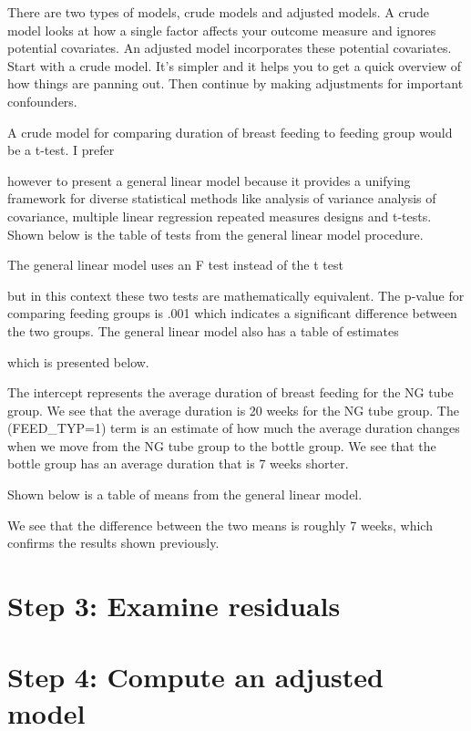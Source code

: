 \documentclass[
  letterpaper,
  DIV=11,
  numbers=noendperiod]{scrreprt}
\begin{document}
\begin{tcolorbox}
There are two types of models, crude models and adjusted models. A crude
model looks at how a single factor affects your outcome measure and
ignores potential covariates. An adjusted model incorporates these
potential covariates. Start with a crude model. It's simpler and it
helps you to get a quick overview of how things are panning out. Then
continue by making adjustments for important confounders.

A crude model for comparing duration of breast feeding to feeding group
would be a t-test. I prefer

however to present a general linear model because it provides a unifying
framework for diverse statistical methods like analysis of variance
analysis of covariance, multiple linear regression repeated measures
designs and t-tests. Shown below is the table of tests from the general
linear model procedure.

The general linear model uses an F test instead of the t test

but in this context these two tests are mathematically equivalent. The
p-value for comparing feeding groups is .001 which indicates a
significant difference between the two groups. The general linear model
also has a table of estimates

which is presented below.

The intercept represents the average duration of breast feeding for the
NG tube group. We see that the average duration is 20 weeks for the NG
tube group. The (FEED\_TYP=1) term is an estimate of how much the
average duration changes when we move from the NG tube group to the
bottle group. We see that the bottle group has an average duration that
is 7 weeks shorter.

Shown below is a table of means from the general linear model.

We see that the difference between the two means is roughly 7 weeks,
which confirms the results shown previously.

\section{Step 3: Examine residuals}\label{step-3-examine-residuals}

\section{Step 4: Compute an adjusted
model}\label{step-4-compute-an-adjusted-model}


\end{tcolorbox}
\end{document}
